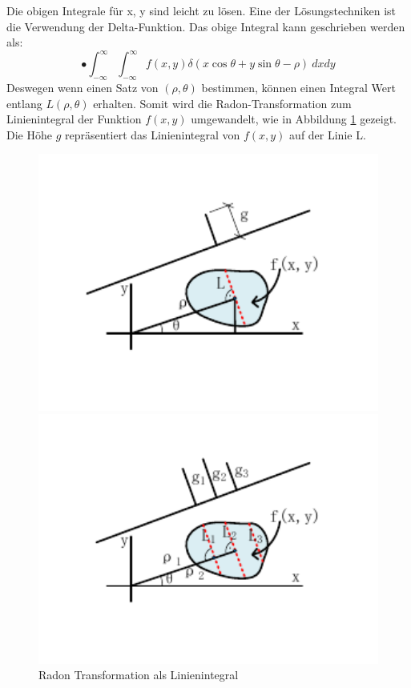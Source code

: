 Die obigen Integrale für x, y sind leicht zu lösen. Eine der Lösungstechniken ist die Verwendung der Delta-Funktion. Das obige Integral kann geschrieben werden als:
\begin{equation}
•  \int_{-\infty}^{\infty} \int_{-\infty}^{\infty} f(x,y)\delta (x\cos{\theta} + y\sin{\theta}-\rho)\ dxdy
\end{equation} 
Deswegen wenn einen Satz von $ (\rho,\theta) $ bestimmen, können einen Integral Wert entlang $ L(\rho,\theta) $ erhalten. Somit wird die Radon-Transformation zum Linienintegral der Funktion $ f(x,y) $ umgewandelt, wie in Abbildung \ref{fig:Radon Transformation als Linienintegral} gezeigt. Die Höhe $ g $ repräsentiert das Linienintegral von $ f(x,y) $ auf der Linie L.

\begin{figure}[H]
\centering 
\begin{minipage}[b]{0.49\textwidth} 
\centering 
\includegraphics[width=1.0\textwidth]{images/4_ZweiteErfahrung/Radon/3.pdf} 
\caption{Radon Transformation als Linienintegral}
\label{fig:Radon Transformation als Linienintegral}
\end{minipage}
\begin{minipage}[b]{0.49\textwidth} 
\centering 
\includegraphics[width=1.0\textwidth]{images/4_ZweiteErfahrung/Radon/4.pdf}

\end{minipage}
\end{figure}
